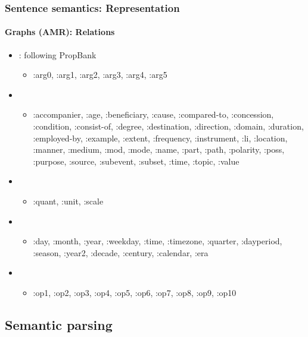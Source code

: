 \documentclass[xcolor=table]{beamer}
\begin{document}
\begin{frame}[fragile]
	\frametitle{Sentence semantics: Representation}
	\framesubtitle{Graphs (AMR): Relations}
	
	\begin{itemize}
		\item {}: following PropBank
		\begin{itemize}
			\item :arg0, :arg1, :arg2, :arg3, :arg4, :arg5
		\end{itemize}
		\item {}
		\begin{itemize}
			\item :accompanier, :age, :beneficiary, :cause, :compared-to, :concession, :condition, :consist-of, :degree, :destination, :direction, :domain, :duration, :employed-by, :example, :extent, :frequency, :instrument, :li, :location, :manner, :medium, :mod, :mode, :name, :part, :path, :polarity, :poss, :purpose, :source, :subevent, :subset, :time, :topic, :value
		\end{itemize}
		\item {}
		\begin{itemize}
			\item :quant, :unit, :scale
		\end{itemize}
		\item {}
		\begin{itemize}
			\item :day, :month,
			:year, :weekday, :time, :timezone, :quarter,
			:dayperiod, :season, :year2, :decade, :century,
			:calendar, :era
		\end{itemize}
		\item {}
		\begin{itemize}
			\item :op1, :op2, :op3, :op4, :op5,
			:op6, :op7, :op8, :op9, :op10
		\end{itemize}
	\end{itemize}
	
\end{frame}


\subsection{Semantic parsing}
\end{document}
